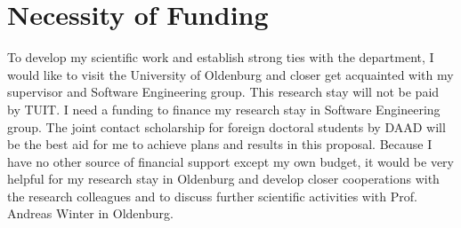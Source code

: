 \documentclass[10pt, oneside]{article}
\begin{document}
\section{Necessity of Funding}
To develop my scientific work and establish strong ties with the department, I would like to visit the University of Oldenburg and closer get acquainted with my supervisor and Software Engineering group. This research stay will not be paid by TUIT. I need a funding to finance my research stay in Software Engineering group. The joint contact scholarship for foreign doctoral students by DAAD will be the best aid for me to achieve plans and results in this proposal. Because I have no other source of financial support except my own budget, it would be very helpful for my research stay in Oldenburg and develop closer cooperations with the research colleagues and to discuss further scientific activities with Prof. Andreas Winter in Oldenburg.



\end{document}
